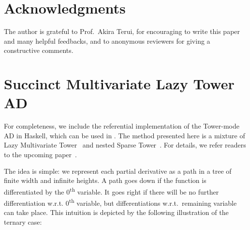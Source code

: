 \section*{Acknowledgments}
The author is grateful to Prof.\ Akira Terui, for encouraging to write this paper and many helpful feedbacks, and to anonymous reviewers for giving a constructive comments.
\appendix
\section{Succinct Multivariate Lazy Tower AD}\label{sec:appendix}
For completeness, we include the referential implementation of the Tower-mode AD in Haskell, which can be used in .
The method presented here is a mixture of Lazy Multivariate Tower~\cite{Pearlmutter:2007aa} and nested Sparse Tower~\cite{Kmett:2010aa}.
For details, we refer readers to the upcoming paper~\cite{Ishii:2021ab}.

The idea is simple: we represent each partial derivative as a path in a tree of finite width and infinite heights.
A path goes down if the function is differentiated by the 0\textsuperscript{th} variable.
It goes right if there will be no further differentiation w.r.t. 0\textsuperscript{th} variable, but differentiations w.r.t.\ remaining variable can take place.
This intuition is depicted by the following illustration of the ternary case:

\begin{center}
\end{center}

